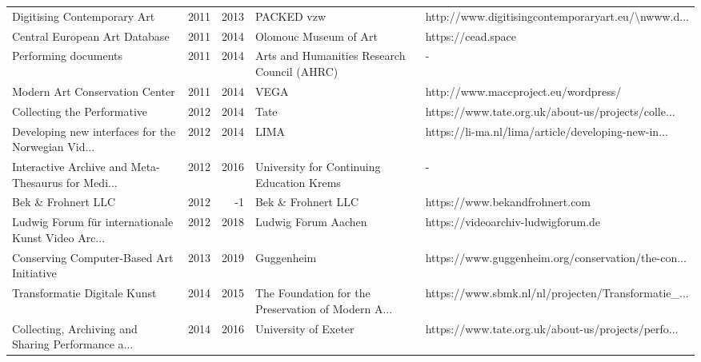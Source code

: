\begin{table}[!h]
\begin{longtable}{lrrll}
                       Digitising Contemporary Art &      2011 & 2013 &                                         PACKED vzw & http://www.digitisingcontemporaryart.eu/\textbackslash nwww.d... \\
                     Central European Art Database &      2011 & 2014 &                              Olomouc Museum of Art &                                https://cead.space  \\
                              Performing documents &      2011 & 2014 &        Arts and Humanities Research Council (AHRC) &                                                  - \\
                    Modern Art Conservation Center &      2011 & 2014 &                                               VEGA &              http://www.maccproject.eu/wordpress/  \\
                       Collecting the Performative &      2012 & 2014 &                                               Tate & https://www.tate.org.uk/about-us/projects/colle... \\
Developing new interfaces for the Norwegian Vid... &      2012 & 2014 &                                               LIMA & https://li-ma.nl/lima/article/developing-new-in... \\
Interactive Archive and Meta-Thesaurus for Medi... &      2012 & 2016 &          University for Continuing Education Krems &                                                  - \\
                                Bek \& Frohnert LLC &      2012 &   -1 &                                 Bek \& Frohnert LLC &                     https://www.bekandfrohnert.com \\
Ludwig Forum für internationale Kunst Video Arc... &      2012 & 2018 &                                Ludwig Forum Aachen &                 https://videoarchiv-ludwigforum.de \\
          Conserving Computer-Based Art Initiative &      2013 & 2019 &                                         Guggenheim & https://www.guggenheim.org/conservation/the-con... \\
                      Transformatie Digitale Kunst &      2014 & 2015 & The Foundation for the Preservation of Modern A... & https://www.sbmk.nl/nl/projecten/Transformatie\_... \\
Collecting, Archiving and Sharing Performance a... &      2014 & 2016 &                               University of Exeter & https://www.tate.org.uk/about-us/projects/perfo... \\

\end{longtable}
\end{table}
